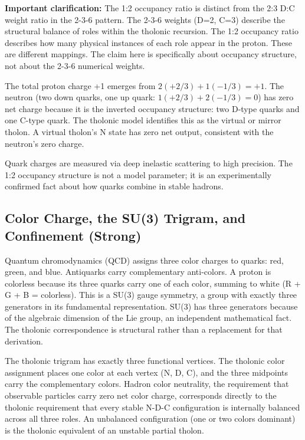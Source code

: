 \documentclass[12pt]{article}
\begin{document}
\textbf{Important clarification:} The 1:2 occupancy ratio is distinct
from the 2:3 D:C weight ratio in the 2-3-6 pattern. The 2-3-6 weights
(D=2, C=3) describe the structural balance of roles within the tholonic
recursion. The 1:2 occupancy ratio describes how many physical instances
of each role appear in the proton. These are different mappings. The
claim here is specifically about occupancy structure, not about the
2-3-6 numerical weights.

The total proton charge +1 emerges from \(2(+2/3) + 1(-1/3) = +1\). The
neutron (two down quarks, one up quark: \(1(+2/3) + 2(-1/3) = 0\)) has
zero net charge because it is the inverted occupancy structure: two
D-type quarks and one C-type quark. The tholonic model identifies this
as the virtual or mirror tholon. A virtual tholon's N state has zero net
output, consistent with the neutron's zero charge.

Quark charges are measured via deep inelastic scattering to high
precision. The 1:2 occupancy structure is not a model parameter; it is
an experimentally confirmed fact about how quarks combine in stable
hadrons.

\subsection{Color Charge, the SU(3) Trigram, and Confinement (Strong)}\label{color-charge-the-su3-trigram-and-confinement-strong}

Quantum chromodynamics (QCD) assigns three color charges to quarks: red,
green, and blue. Antiquarks carry complementary anti-colors. A proton is
colorless because its three quarks carry one of each color, summing to
white (R + G + B = colorless). This is a SU(3) gauge symmetry, a group
with exactly three generators in its fundamental representation. SU(3)
has three generators because of the algebraic dimension of the Lie
group, an independent mathematical fact. The tholonic correspondence is
structural rather than a replacement for that derivation.

The tholonic trigram has exactly three functional vertices. The tholonic
color assignment places one color at each vertex (N, D, C), and the
three midpoints carry the complementary colors. Hadron color neutrality,
the requirement that observable particles carry zero net color charge,
corresponds directly to the tholonic requirement that every stable N-D-C
configuration is internally balanced across all three roles. An
unbalanced configuration (one or two colors dominant) is the tholonic
equivalent of an unstable partial tholon.
\end{document}
